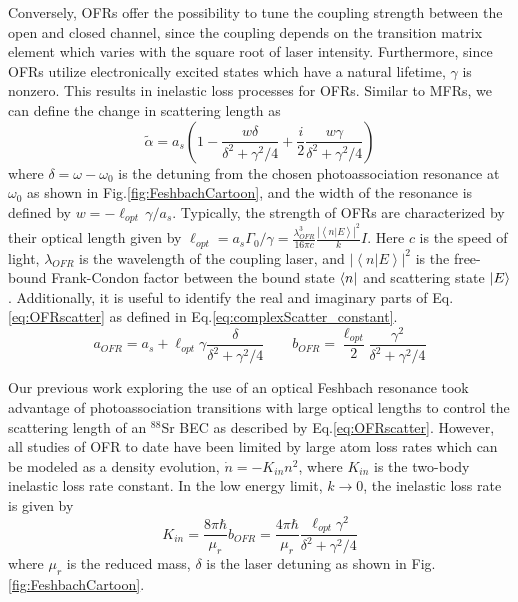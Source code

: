 Conversely, OFRs offer the possibility to tune the coupling strength between the open and closed channel, since the coupling depends on the transition matrix element which varies with the square root of laser intensity. Furthermore, since OFRs utilize electronically excited states which have a natural lifetime, $\gamma$ is nonzero. This results in inelastic loss processes for OFRs. Similar to MFRs, we can define the change in scattering length as \cite{Nicholson2015a,Yan2013c,Blatt}
	\begin{equation} \label{eq:OFRscatter}
		\tilde{\alpha} = a_s \left( 1 - \frac{w \delta}{\delta^2 + \gamma^2/4} + \frac{i}{2} \frac{w \gamma}{\delta^2 + \gamma^2/4} \right)
	\end{equation}
where $\delta=\omega - \omega_0$ is the detuning from the chosen photoassociation resonance at $\omega_0$ as shown in Fig.\;\ref{fig:FeshbachCartoon}, and the width of the resonance is defined by $w = -\ell_{opt} \, \gamma / a_s$. Typically, the strength of OFRs are characterized by their optical length \cite{Nicholson2015a,Chin2010} given by $\ell_{opt} = a_s \Gamma_0 / \gamma = \frac{\lambda_{OFR}^3}{16 \pi c} \frac{ \left| \left< n | E \right> \right|^2}{k} I$. Here $c$ is the speed of light, $\lambda_{OFR}$ is the wavelength of the coupling laser, and $\left| \left< n | E \right> \right|^2$ is the free-bound Frank-Condon factor between the bound state $\left< {n} \right|$ and scattering state $\left| {E} \right>$. Additionally, it is useful to identify the real and imaginary parts of Eq.\;\ref{eq:OFRscatter} as defined in Eq.\;\ref{eq:complexScatter_constant}.
	\begin{equation} \label{eq:OFRparts}
		 a_{\scriptscriptstyle OFR} = a_s + \ell_{opt} \gamma \frac{\delta}{\delta^2+\gamma^2/4} \qquad
		 b_{\scriptscriptstyle OFR} = \frac{\ell_{opt}}{2} \frac{\gamma^2}{\delta^2+\gamma^2/4}
	\end{equation}

Our previous work exploring the use of an optical Feshbach resonance took advantage of photoassociation transitions with large optical lengths to control the scattering length of an $^{88}$Sr BEC as described by Eq.\;\ref{eq:OFRscatter}. However, all studies of OFR to date have been limited by large atom loss rates \cite{Thalhammer2005,Theis2004,Fatemi2000,Blatt,Yan2013c} which can be modeled as a density evolution, $\dot{n} = -K_{in}n^2$, where $K_{in}$ is the two-body inelastic loss rate constant. In the low energy limit, $k\!\rightarrow\!0$, the inelastic loss rate is given by
	\begin{equation} \label{eq:K_in}
		K_{in} = \frac{8 \pi \hbar}{\mu_{r}} b_{\scriptscriptstyle OFR} = \frac{4 \pi \hbar}{\mu_r} \frac{\ell_{opt} \gamma^2}{\delta^2 + \gamma^2 / 4}
	\end{equation}
where $\mu_r$ is the reduced mass, $\delta$ is the laser detuning as shown in Fig.\;\ref{fig:FeshbachCartoon}.


